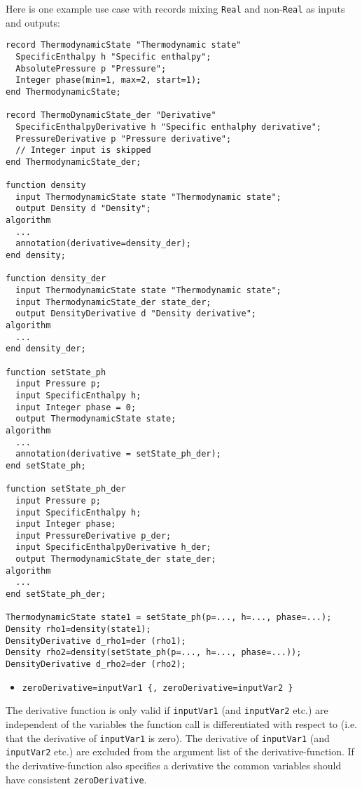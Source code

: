 \begin{example}
Here is one example use case with records mixing \lstinline!Real! and
non-\lstinline!Real! as inputs and outputs:
\begin{lstlisting}[language=modelica]
record ThermodynamicState "Thermodynamic state"
  SpecificEnthalpy h "Specific enthalpy";
  AbsolutePressure p "Pressure";
  Integer phase(min=1, max=2, start=1);
end ThermodynamicState;

record ThermoDynamicState_der "Derivative"
  SpecificEnthalpyDerivative h "Specific enthalphy derivative";
  PressureDerivative p "Pressure derivative";
  // Integer input is skipped
end ThermodynamicState_der;

function density
  input ThermodynamicState state "Thermodynamic state";
  output Density d "Density";
algorithm
  ...
  annotation(derivative=density_der);
end density;

function density_der
  input ThermodynamicState state "Thermodynamic state";
  input ThermodynamicState_der state_der;
  output DensityDerivative d "Density derivative";
algorithm
  ...
end density_der;

function setState_ph
  input Pressure p;
  input SpecificEnthalpy h;
  input Integer phase = 0;
  output ThermodynamicState state;
algorithm
  ...
  annotation(derivative = setState_ph_der);
end setState_ph;

function setState_ph_der
  input Pressure p;
  input SpecificEnthalpy h;
  input Integer phase;
  input PressureDerivative p_der;
  input SpecificEnthalpyDerivative h_der;
  output ThermodynamicState_der state_der;
algorithm
  ...
end setState_ph_der;

ThermodynamicState state1 = setState_ph(p=..., h=..., phase=...);
Density rho1=density(state1);
DensityDerivative d_rho1=der (rho1);
Density rho2=density(setState_ph(p=..., h=..., phase=...));
DensityDerivative d_rho2=der (rho2);
\end{lstlisting}
\end{example}

\begin{itemize}
\item
  \lstinline!zeroDerivative=inputVar1 {, zeroDerivative=inputVar2 }!
\end{itemize}

The derivative function is only valid if \lstinline!inputVar1! (and \lstinline!inputVar2! etc.)
are independent of the variables the function call is differentiated
with respect to (i.e. that the derivative of \lstinline!inputVar1! is zero). The
derivative of \lstinline!inputVar1! (and \lstinline!inputVar2! etc.) are excluded from the
argument list of the derivative-function. If the derivative-function
also specifies a derivative the common variables should have consistent
\lstinline!zeroDerivative!.

